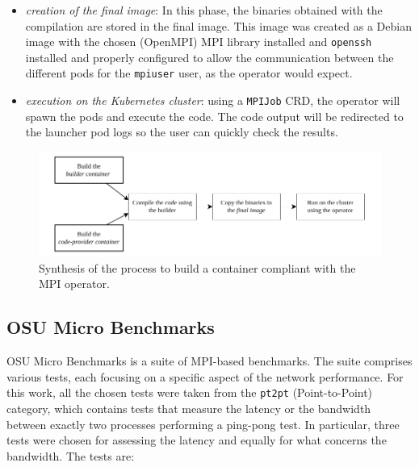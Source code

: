 \begin{itemize}
  \item \textit{creation of the final image}: In this phase, the binaries
    obtained with the compilation are stored in the final image. This image was
    created as a Debian image with the chosen (OpenMPI) MPI library installed
    and \texttt{openssh} installed and properly configured to allow the
    communication between the different pods for the \texttt{mpiuser} user, as
    the operator would expect.

  \item \textit{execution on the Kubernetes cluster}: using a \texttt{MPIJob}
    CRD, the operator will spawn the pods and execute the code. The code output
    will be redirected to the launcher pod logs so the user can quickly check the
    results.
\end{itemize}


\begin{figure}
  \centering
  \includegraphics[width=\textwidth]{img/chpt3/mpi-container-building}
  \caption{Synthesis of the process to build a container compliant with the MPI
    operator.}
  \label{fig:mpi-container-creation}
\end{figure}


\subsection{OSU Micro Benchmarks}

OSU Micro Benchmarks\cite{osu} is a suite of MPI-based benchmarks. The suite
comprises various tests, each focusing on a specific aspect of the network
performance. For this work, all the chosen tests were taken from the
\texttt{pt2pt} (Point-to-Point) category, which contains tests that measure the
latency or the bandwidth between exactly two processes performing a ping-pong
test. In particular, three tests were chosen for assessing the latency and
equally for what concerns the bandwidth. The tests are:

